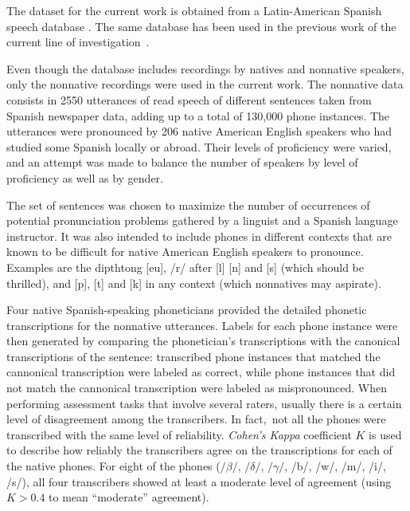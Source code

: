 The dataset for the current work is obtained from a Latin-American Spanish speech database
\cite{database_collection}.  The same database has been used in the previous work of the
current line of \mbox{investigation \cite{main}}.

Even though the database includes recordings by natives and nonnative
speakers, only the nonnative recordings were used in the current work.
The nonnative data consists in 2550 utterances of read speech of different sentences
taken from Spanish newspaper data, adding up to
a total of 130,000 phone instances. The utterances were pronounced by 206 native American English
speakers who had studied some Spanish locally or abroad. Their levels of proficiency were varied,
and an attempt was made to balance the number of speakers by level of proficiency as well as by
gender.

The set of sentences was chosen to maximize the number of
occurrences of potential pronunciation problems gathered by a linguist and a Spanish language
instructor. It was also intended to include phones in different contexts that are known to be
difficult for native American English speakers to pronounce.
Examples are the dipthtong [eu], /r/ after [l] [n] and [s] (which should be
thrilled), and [p], [t] and [k] in any context (which nonnatives may aspirate).

Four native Spanish-speaking phoneticians provided the detailed phonetic transcriptions
for the nonnative utterances. Labels
for each phone instance were then generated by comparing the phonetician's transcriptions with
the canonical transcriptions of the sentence: transcribed phone instances that
matched the cannonical transcription were labeled as correct, while phone instances that did not
match the cannonical transcription were labeled as mispronounced. When performing assessment
tasks that involve several raters, usually there is a certain level of disagreement among the
transcribers. In fact, not all the phones were transcribed with the same level of reliability.
\textit{Cohen's Kappa} coefficient $K$ \cite{kappa} is used to describe how reliably the
transcribers agree on the transcriptions for each of the native phones. For eight of the phones
($/\beta/$, $/\delta/$, $/\gamma/$, /b/, /w/, /m/, /i/, /s/), all four transcribers showed at least
a moderate level of agreement (using $K > 0.4$ to mean ``moderate'' agreement).

